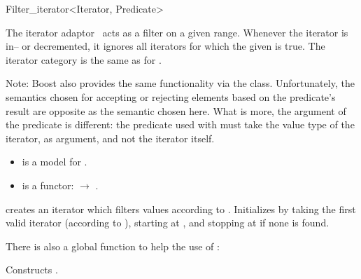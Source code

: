 \begin{ccRefClass}{Filter_iterator<Iterator, Predicate>}
  \label{sectionFilterIterator}

  
  \ccDefinition The iterator adaptor \ccClassTemplateName\ acts as a
  filter on a given range. Whenever the iterator is in-- or
  decremented, it ignores all iterators for which the given
   is true. The iterator category is the same as for
  .

  Note: Boost also provides the same functionality via the
   class.  Unfortunately, the semantics
  chosen for accepting or rejecting elements based on the predicate's
  result are opposite as the semantic chosen here. What is more, the
  argument of the predicate is different: the predicate used with
   must take the value type of the iterator, as
  argument, and not the iterator itself.

  
  \ccRequirements
  \begin{itemize}
  \item {} is a model for .
  \item {} is a functor:  $\rightarrow$
    .
  \end{itemize}

  \ccCreation

  
  
   {creates an iterator which filters values according to .
    Initializes by taking the first valid iterator (according to ),
    starting at , and stopping at  if none is found.}

  There is also a global function to help the use of \ccClassTemplateName{}:

  { Constructs . }
\end{ccRefClass}


